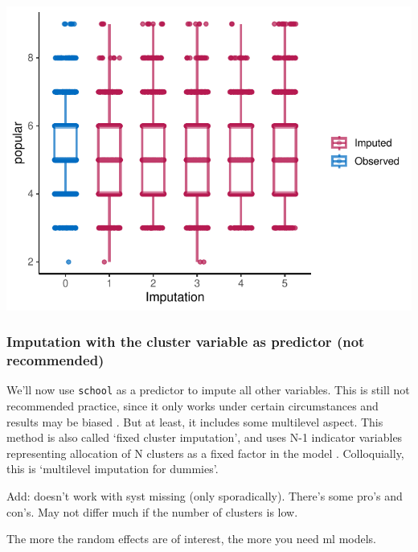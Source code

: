 \documentclass[
]{jss}
\begin{document}
\begin{CodeChunk}


\begin{center}\includegraphics{Imputation_of_Incomplete_Multilevel_Data_files/figure-latex/pop_ignored_eval-1} \end{center}

\end{CodeChunk}

\hypertarget{imputation-with-the-cluster-variable-as-predictor-not-recommended}{%
\subsubsection{Imputation with the cluster variable as predictor (not
recommended)}\label{imputation-with-the-cluster-variable-as-predictor-not-recommended}}

We'll now use \texttt{school} as a predictor to impute all other
variables. This is still not recommended practice, since it only works
under certain circumstances and results may be biased
\citep{drec15, ende16}. But at least, it includes some multilevel
aspect. This method is also called `fixed cluster imputation', and uses
N-1 indicator variables representing allocation of N clusters as a fixed
factor in the model \citep{reit06, ende16}. Colloquially, this is
`multilevel imputation for dummies'.

Add: doesn't work with syst missing (only sporadically). There's some
pro's and con's. May not differ much if the number of clusters is low.

The more the random effects are of interest, the more you need ml
models.
\end{document}
